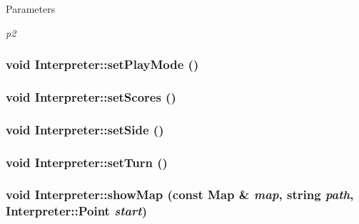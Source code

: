 \begin{DoxyParams}{Parameters}
\item[{\em p2}]\end{DoxyParams}
\hypertarget{classInterpreter_aef305fb79ee56df26f7fa4d2fb1be84e}{
\subsubsection[{setPlayMode}]{\setlength{\rightskip}{0pt plus 5cm}void Interpreter::setPlayMode ()}}
\label{classInterpreter_aef305fb79ee56df26f7fa4d2fb1be84e}
\hypertarget{classInterpreter_ad947f5a13997ba025515d65be4ca13a3}{
\subsubsection[{setScores}]{\setlength{\rightskip}{0pt plus 5cm}void Interpreter::setScores ()}}
\label{classInterpreter_ad947f5a13997ba025515d65be4ca13a3}
\hypertarget{classInterpreter_a7bcbe98cfcb820392776af34325af2f4}{
\subsubsection[{setSide}]{\setlength{\rightskip}{0pt plus 5cm}void Interpreter::setSide ()}}
\label{classInterpreter_a7bcbe98cfcb820392776af34325af2f4}
\hypertarget{classInterpreter_a976750d75dbde52f1de42b189bc3db0d}{
\subsubsection[{setTurn}]{\setlength{\rightskip}{0pt plus 5cm}void Interpreter::setTurn ()}}
\label{classInterpreter_a976750d75dbde52f1de42b189bc3db0d}
\hypertarget{classInterpreter_ae09346bdc7e055a43f760cb2b868357f}{
\subsubsection[{showMap}]{\setlength{\rightskip}{0pt plus 5cm}void Interpreter::showMap (const {\bf Map} \& {\em map}, \/  string {\em path}, \/  {\bf Interpreter::Point} {\em start})}}
\label{classInterpreter_ae09346bdc7e055a43f760cb2b868357f}


